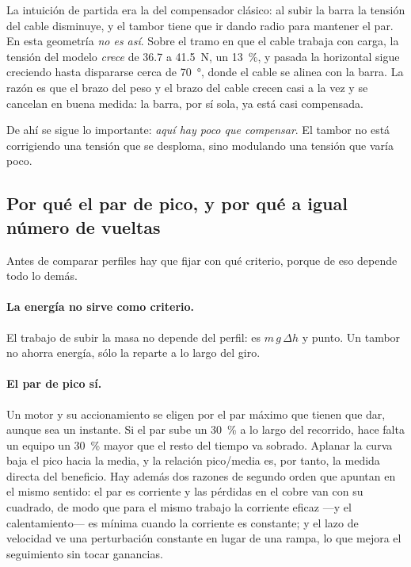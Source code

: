 La intuición de partida era la del compensador clásico: al subir la barra la tensión del cable
disminuye, y el tambor tiene que ir dando radio para mantener el par. En esta geometría \emph{no es
así}. Sobre el tramo en que el cable trabaja con carga, la tensión del modelo \emph{crece} de
\num{36.7} a \SI{41.5}{\newton}, un \SI{+13}{\percent}, y pasada la horizontal sigue creciendo hasta
dispararse cerca de \SI{70}{\degree}, donde el cable se alinea con la barra. La razón es que el brazo
del peso y el brazo del cable crecen casi a la vez y se cancelan en buena medida: la barra, por sí
sola, ya está casi compensada.

De ahí se sigue lo importante: \emph{aquí hay poco que compensar}. El tambor no está corrigiendo una
tensión que se desploma, sino modulando una tensión que varía poco.

\subsection{Por qué el par de pico, y por qué a igual número de vueltas}
\label{sec:mod-criterio}

Antes de comparar perfiles hay que fijar con qué criterio, porque de eso depende todo lo demás.

\paragraph{La energía no sirve como criterio.} El trabajo de subir la masa no depende del perfil:
es $m\,g\,\Delta h$ y punto. Un tambor no ahorra energía, sólo la reparte a lo largo del giro.

\paragraph{El par de pico sí.} Un motor y su accionamiento se eligen por el par máximo que tienen
que dar, aunque sea un instante. Si el par sube un \SI{30}{\percent} a lo largo del recorrido, hace
falta un equipo un \SI{30}{\percent} mayor que el resto del tiempo va sobrado. Aplanar la curva baja
el pico hacia la media, y la relación pico/media es, por tanto, la medida directa del beneficio. Hay
además dos razones de segundo orden que apuntan en el mismo sentido: el par es corriente y las
pérdidas en el cobre van con su cuadrado, de modo que para el mismo trabajo la corriente eficaz
---y el calentamiento--- es mínima cuando la corriente es constante; y el lazo de velocidad ve una
perturbación constante en lugar de una rampa, lo que mejora el seguimiento sin tocar ganancias.

